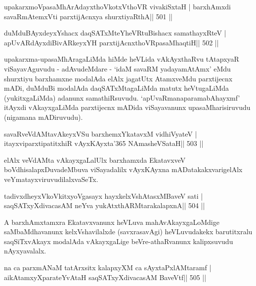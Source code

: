 

\begin{shl}
upakarxmoVpasaMhArAdayxthoVkotxV\s thoVR vivakiSxtaH |
barxhAmxdi savaRmAtemxVti parxtijAcnxya shurxtiyaRthA\hfill || 501 ||
\end{shl}

\begin{shl}
duMduBAyxdeyxYshacx daqSATxMteYheVRtuBishacx samathayxRteV |
apUvARdAyxdiBivARkeyxYH parxtijAcnxthoVRpasaMhaqtiH\hfill || 502 ||
\end{shl}

\begin{artha}
upakarxma-upasaMhAragaLiMda hiMde heVLida vAkAyxthaRvu tAtapxyaR\break
viSayavAguvudu - adAvudeMdare - `idaM savaRM yadayamAtAmx' eMdu
shurxtiyu barxhamxne modalAda elAlx jagatUtx AtamxveMdu parxtijecnx
mADi, duMduBi modalAda daqSATxMtagaLiMda matutx heVtugaLiMda
(yukitxgaLiMda) adanunx samathiRsuvudu. `apUvaRmanaparamabAhayxmf'
itAyxdi vAkayxgaLiMda parxtijecnx mADida viSayavanunx
upasaMharisiruvudu (nigamana mADiruvudu).
\end{artha}

\begin{shl}
savaRveVdAMtavAkeyxVSu barxhemxYkatavxM vidhiVyateV |
itayxviparxtipatitxhiR vAyxKAyxta\char'365 NAmasheVSataH\hfill || 503 ||
\end{shl}

\begin{artha}
elAlx veVdAMta vAkayxgaLalUlx barxhamxda EkatavxveV boVdhisalapxDuvadeMbuva viSayadalilx vAyxKAyxna mADatakakxvarigelAlx veYmatayxviruvudilalxvaSeTx.
\end{artha}

\begin{shl}
tadivxdheyxVkoVkitxyoVgasayx hayxkelxVshAtasxMBaveV sati |
saqSATxyXdivacasAM neYva yukAtx\s thARMtarakalapxnA\hfill || 504 ||
\end{shl}

\begin{artha}
A barxhAmxtamxra Ekatavxvanunx heVLuva mahAvAkayxgaLoMdige saMbaMdhavanunx kelxVshavilalxde (savxrasavAgi) heVLuvudakekx barutitxralu saqSiTxvAkayx modalAda vAkayxgaLige beVre-athaRvanunx kalipxsuvudu nAyxyavalalx.
\end{artha}

\begin{shl}
na ca parxmANaM tatArxsitx kalapxyXM ca sAyxtaPxlAMtaramf |
aikAtamxyXparateYvAtaH saqSATxyXdivacasAM BaveVtf\hfill || 505 ||
\end{shl}

